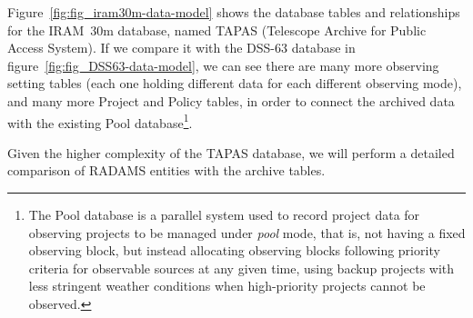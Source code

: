 			Figure~\ref{fig:fig_iram30m-data-model} shows the
			database tables and relationships for the IRAM~30m
			database, named TAPAS (Telescope Archive for
			Public Access System). If we compare it with the DSS-63
			database in figure~\ref{fig:fig_DSS63-data-model}, we
			can see there are many more observing setting tables
			(each one holding different data for each different
			observing mode), and many more Project and Policy
			tables, in order to connect the archived data with the
			existing Pool database\footnote{The Pool database is a
			parallel system used to record project data for
			observing projects to be managed under \emph{pool}
			mode, that is, not having a fixed observing block, but
			instead allocating observing blocks following priority
			criteria for observable sources at any given time,
			using backup projects with less stringent weather
			conditions when high-priority projects cannot be
			observed.}.
			
			Given the higher complexity of the TAPAS database, we
			will perform a detailed comparison of RADAMS entities
			with the archive tables.
			
